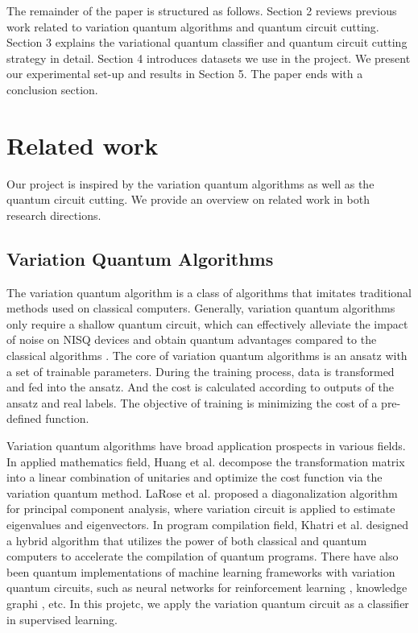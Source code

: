 \documentclass[sigconf]{acmart}
\begin{document}
The remainder of the paper is structured as follows. Section 2 reviews previous work related to variation quantum algorithms and quantum circuit cutting. Section 3 explains the variational quantum classifier and quantum circuit cutting strategy in detail. Section 4 introduces datasets we use in the project. We present our experimental set-up and results in Section 5. The paper ends with a conclusion section.

\section{Related work}

Our project is inspired by the variation quantum algorithms as well as the quantum circuit cutting. We provide an overview on related work in both research directions.

\subsection{Variation Quantum Algorithms}
The variation quantum algorithm is a class of algorithms that imitates traditional methods used on classical computers. Generally, variation quantum algorithms only require a shallow quantum circuit, which can effectively alleviate the impact of noise on NISQ devices and obtain quantum advantages compared to the classical algorithms \cite{cerezo2021}. The core of variation quantum algorithms is an ansatz with a set of trainable parameters. During the training process, data is transformed and fed into the ansatz. And the cost is calculated according to outputs of the ansatz and real labels. The objective of training is minimizing the cost of a pre-defined function.

Variation quantum algorithms have broad application prospects in various fields. In applied mathematics field, Huang et al. \cite{vqa-huang} decompose the transformation matrix into a linear combination of unitaries and optimize the cost function via the variation quantum method. LaRose et al. \cite{vqa-larose} proposed a diagonalization algorithm for principal component analysis, where variation circuit is applied to estimate eigenvalues and eigenvectors. In program compilation field, Khatri et al. \cite{vqa-qc} designed a hybrid algorithm that utilizes the power of both classical and quantum computers to accelerate the compilation of quantum programs. There have also been quantum implementations of machine learning frameworks with variation quantum circuits, such as neural networks for reinforcement learning \cite{vqa-rl}, knowledge graphi \cite{vqa-kg}, etc. In this projetc, we apply the variation quantum circuit as a classifier in supervised learning.
\end{document}
